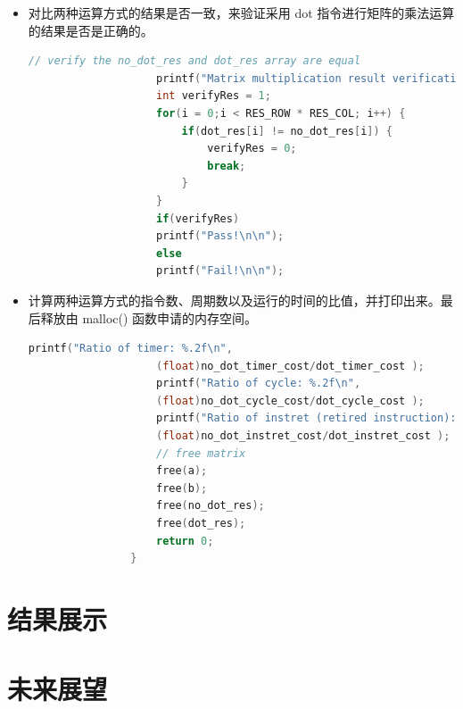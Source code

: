 \documentclass[a4paper, 14pt, oneside]{book} %
\numberwithin{equation}{subsection}
\begin{document}
\begin{enumerate}
\begin{itemize}
\begin{lstlisting}[language={C++}]
					printf("dot time cost: %.2fms\n", (float)dot_timer_cost/RTC_FREQ*1000);
					printf("dot_cycle: %u\n", dot_cycle_cost);
					printf("dot_instret: %u\n", dot_instret_cost);
					printf("dot CPI: %.2f\n\n", (float)dot_cycle_cost/dot_instret_cost);	
				\end{lstlisting}
				\item 对比两种运算方式的结果是否一致，来验证采用 dot 指令进行矩阵的乘法运算的结果是否是正确的。
				\begin{lstlisting}[language={C++}]
					// verify the no_dot_res and dot_res array are equal
					printf("Matrix multiplication result verification: \n");
					int verifyRes = 1;
					for(i = 0;i < RES_ROW * RES_COL; i++) {
						if(dot_res[i] != no_dot_res[i]) {
							verifyRes = 0;
							break;
						}
					}
					if(verifyRes)
					printf("Pass!\n\n");
					else
					printf("Fail!\n\n");	
				\end{lstlisting}
				\item 计算两种运算方式的指令数、周期数以及运行的时间的比值，并打印出来。最后释放由 malloc() 函数申请的内存空间。
				\begin{lstlisting}[language={C++}]
					printf("Ratio of timer: %.2f\n",
					(float)no_dot_timer_cost/dot_timer_cost );
					printf("Ratio of cycle: %.2f\n",
					(float)no_dot_cycle_cost/dot_cycle_cost );
					printf("Ratio of instret (retired instruction): %.2f\n",
					(float)no_dot_instret_cost/dot_instret_cost );	
					// free matrix
					free(a);
					free(b);
					free(no_dot_res);
					free(dot_res);
					return 0;
				}
			\end{lstlisting}
			
		\end{itemize}
	\end{enumerate}	

	\section{结果展示}	
	
	
	\section{未来展望}
	
	
\end{document}
